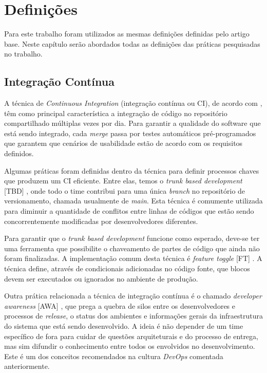 \section{Definições}

Para este trabalho foram utilizados as mesmas definições definidas pelo artigo base. Neste capítulo serão abordados todas as definições das práticas pesquisadas no trabalho.

\subsection{Integração Contínua}

A técnica de \emph{Continuous Integration} (integração contínua ou CI), de acordo com \cite{fowlerCI}, têm como principal característica a integração de código no repositório compartilhado múltiplas vezes por dia. Para garantir a qualidade do software que está sendo integrado, cada \emph{merge} passa por testes automáticos pré-programados que garantem que cenários de usabilidade estão de acordo com os requisitos definidos. 

Algumas práticas foram definidas dentro da técnica para definir processos chaves que produzem um CI eficiente. Entre elas, temos o \emph{trunk based development} [TBD] \cite{devAndDeploymentFB}, onde todo o time contribui para uma única \emph{branch} no repositório de versionamento, chamada usualmente de \emph{main}. Esta técnica é comumente utilizada para diminuir a quantidade de conflitos entre linhas de códigos que estão sendo concorrentemente modificadas por desenvolvedores diferentes. 

Para garantir que o \emph{trunk based development} funcione como esperado, deve-se ter uma ferramenta que possibilite o chaveamento de partes de código que ainda não foram finalizadas. A implementação comum desta técnica é \emph{feature toggle} [FT] \cite{featureToggles}. A técnica define, através de condicionais adicionadas no código fonte, que blocos devem ser executados ou ignorados no ambiente de produção.

Outra prática relacionada a técnica de integração contínua é o chamado \emph{developer awareness} [AWA] \cite{awa}, que prega a quebra de silos entre os desenvolvedores e processos de \emph{release}, o status dos ambientes e informações gerais da infraestrutura do sistema que está sendo desenvolvido. A ideia é não depender de um time específico de fora para cuidar de questões arquiteturais e do processo de entrega, mas sim difundir o conhecimento entre todos os envolvidos no desenvolvimento. Este é um dos conceitos recomendados na cultura \emph{DevOps} comentada anteriormente.

